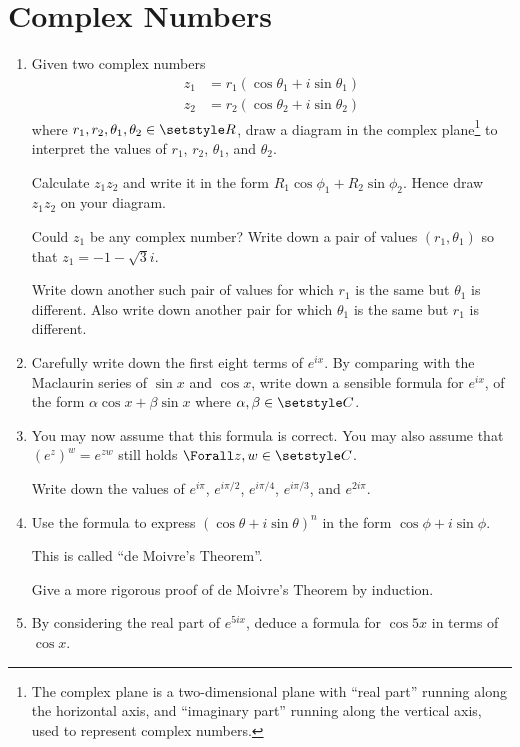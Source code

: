 \section*{Complex Numbers}

\begin{enumerate}
 \item
  Given two complex numbers
  \begin{align*}
   z_1 &= r_1(\cos \theta_1 + i \sin \theta_1) \\
   z_2 &= r_2(\cos \theta_2 + i \sin \theta_2)
  \end{align*}
  where \(r_1, r_2, \theta_1, \theta_2 \in \Reals\), draw a diagram in the
  complex plane\footnote{
   The complex plane is a two-dimensional plane with ``real part'' running along
   the horizontal axis, and ``imaginary part'' running along the vertical axis,
   used to represent complex numbers.
  } to interpret the values of
  \(r_1\), \(r_2\), \(\theta_1\), and \(\theta_2\).

  Calculate \(z_1 z_2\) and write it in the form
  \(R_1 \cos \phi_1 + R_2 \sin \phi_2\). Hence draw \(z_1 z_2\) on your diagram.

  Could \(z_1\) be any complex number? Write down a pair of values
  \((r_1, \theta_1)\) so that \(z_1 = -1 - \sqrt 3i\).

  Write down another such pair of values for which \(r_1\) is the same but
  \(\theta_1\) is different. Also write down another pair for which
  \(\theta_1\) is the same but \(r_1\) is different.
 \item
  Carefully write down the first eight terms of \(e^{ix}\). By comparing with
  the Maclaurin series of \(\sin x\) and \(\cos x\), write down a sensible
  formula for \(e^{ix}\), of the form \(\alpha \cos x + \beta \sin x\) where
  \(\alpha, \beta \in \Complex\).
 \item
  You may now assume that this formula is correct. You may also assume that
  \((e^z)^w = e^{zw}\) still holds \(\Forall z, w \in \Complex\).

  Write down the values of \(e^{i\pi}\), \(e^{i\pi / 2}\),
  \(e^{i\pi / 4}\), \(e^{i\pi / 3}\), and \(e^{2 i \pi}\).
 \item
  Use the formula to express
  \((\cos \theta + i \sin \theta)^n\) in the form \(\cos \phi + i \sin \phi\).

  This is called ``de Moivre's Theorem''.

  Give a more rigorous proof of de Moivre's Theorem by induction.
 \item
  By considering the real part of
  \(e^{5ix}\), deduce a formula for \(\cos 5x\) in terms of \(\cos x\).


\end{enumerate}
